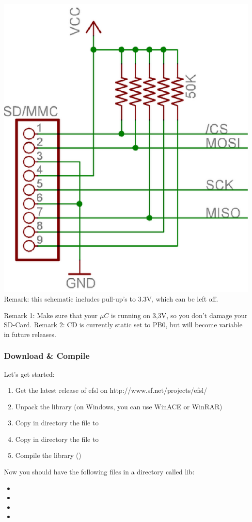 \parbox[c]{.5\textwidth}{\begin{center}
	\includegraphics[width=.5\textwidth]{pics/sdconnection}
	\newline\newline
	Remark: this schematic includes pull-up's to 3.3V, which
	can be left off.
\end{center}}
\newline
Remark 1: Make sure that your $\mu C$ is running on 3,3V, so you don't
damage your SD-Card.\newline
\newline
Remark 2: CD is currently static set to PB0, but will become variable
in future releases.
\subsubsection{Download \& Compile}
Let's get started:
\begin{enumerate}
	\item{Get the latest release of efsl on http://www.sf.net/projects/efsl/}
	\item{Unpack the library (on Windows, you can use WinACE or WinRAR)}
	\item{Copy in directory  the file 
		 to }
	\item{Copy in directory  the file 
		 to }
	\item{Compile the library ()}
\end{enumerate}
Now you should have the following files in a directory called {lib}:
\begin{itemize}
	\item{}
	\item{}
	\item{}
	\item{}
\end{itemize}
